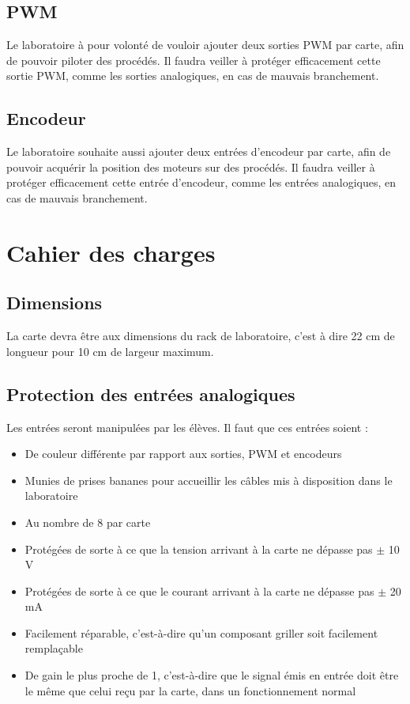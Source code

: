 \documentclass{report}
\begin{document}
\subsection{PWM}
Le laboratoire à pour volonté de vouloir ajouter deux sorties PWM par carte, afin de pouvoir piloter des procédés. Il faudra veiller à protéger efficacement cette sortie PWM, comme les sorties analogiques, en cas de mauvais branchement.

\subsection{Encodeur}
Le laboratoire souhaite aussi ajouter deux entrées d'encodeur par carte, afin de pouvoir acquérir la position des moteurs sur des procédés. Il faudra veiller à protéger efficacement cette entrée d'encodeur, comme les entrées analogiques, en cas de mauvais branchement.

\section{Cahier des charges}
\subsection{Dimensions}
La carte devra être aux dimensions du rack de laboratoire, c'est à dire 22 cm de longueur pour 10 cm de largeur maximum.

\subsection{Protection des entrées analogiques}
Les entrées seront manipulées par les élèves. Il faut que ces entrées soient :
\begin{itemize}
\item De couleur différente par rapport aux sorties, PWM et encodeurs
\item Munies de prises bananes pour accueillir les câbles mis à disposition dans le laboratoire
\item Au nombre de 8 par carte
\item Protégées de sorte à ce que la tension arrivant à la carte ne dépasse pas $\pm$ 10 V
\item Protégées de sorte à ce que le courant arrivant à la carte ne dépasse pas $\pm$ 20 mA
\item Facilement réparable, c'est-à-dire qu'un composant griller soit facilement remplaçable
\item De gain le plus proche de 1, c'est-à-dire que le signal émis en entrée doit être le même que celui reçu par la carte, dans un fonctionnement normal
\end{itemize}
\end{document}
